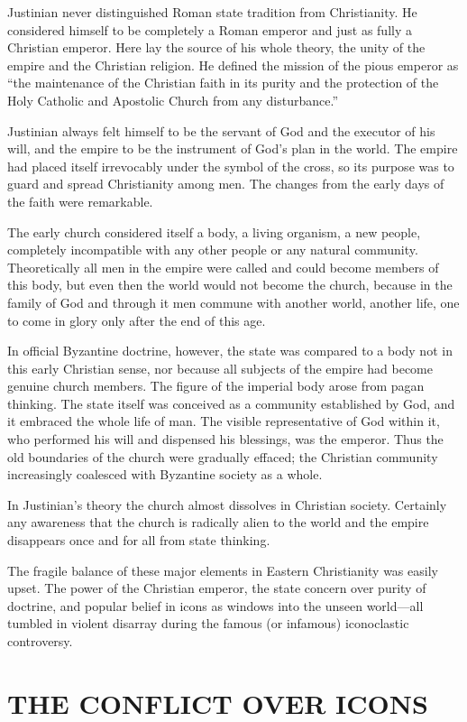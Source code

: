 Justinian never distinguished Roman state tradition from Christianity. He considered himself to be
completely a Roman emperor and just as fully a Christian emperor. Here lay the source of his whole
theory, the unity of the empire and the Christian religion. He defined the mission of the pious
emperor as “the maintenance of the Christian faith in its purity and the protection of the Holy
Catholic and Apostolic Church from any disturbance.”

Justinian always felt himself to be the servant of God and the executor of his will, and the empire
to be the instrument of God’s plan in the world. The empire had placed itself irrevocably under the
symbol of the cross, so its purpose was to guard and spread Christianity among men. The changes from
the early days of the faith were remarkable.

The early church considered itself a body, a living organism, a new people, completely incompatible
with any other people or any natural community. Theoretically all men in the empire were called and
could become members of this body, but even then the world would not become the church, because in
the family of God and through it men commune with another world, another life, one to come in glory
only after the end of this age.

In official Byzantine doctrine, however, the state was compared to a body not in this early
Christian sense, nor because all subjects of the empire had become genuine church members. The
figure of the imperial body arose from pagan thinking. The state itself was conceived as a community
established by God, and it embraced the whole life of man. The visible representative of God within
it, who performed his will and dispensed his blessings, was the emperor. Thus the old boundaries of
the church were gradually effaced; the Christian community increasingly coalesced with Byzantine
society as a whole.

In Justinian’s theory the church almost dissolves in Christian society. Certainly any awareness that
the church is radically alien to the world and the empire disappears once and for all from state
thinking.

The fragile balance of these major elements in Eastern Christianity was easily upset. The power of
the Christian emperor, the state concern over purity of doctrine, and popular belief in icons as
windows into the unseen world—all tumbled in violent disarray during the famous (or infamous)
iconoclastic controversy.

\section{THE CONFLICT OVER ICONS}

